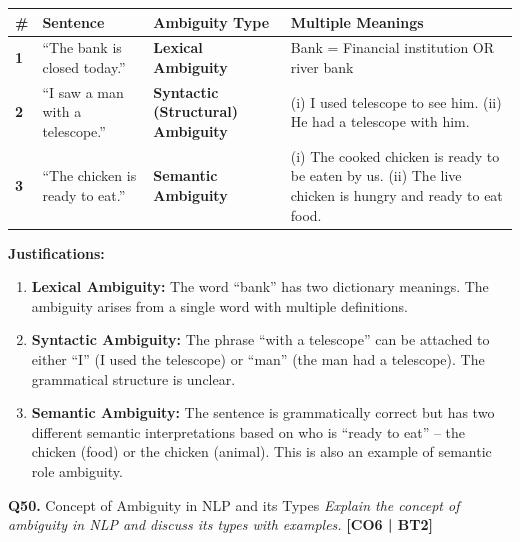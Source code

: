 \documentclass[12pt,a4paper]{article}
\newcommand{\Qno}[1]{\textbf{\color{darkred}Q#1.}}
\newcommand{\term}[1]{\textbf{\color{headingcolor}#1}}
\begin{document}
\begin{answerenv}

\begin{center}
\begin{tabular}{>{\bfseries}p{0.5cm} p{5cm} p{3.5cm} p{4cm}}
\toprule
\textbf{\#} & \textbf{Sentence} & \textbf{Ambiguity Type} & \textbf{Multiple Meanings} \\
\midrule
1 & ``The bank is closed today.'' & \textbf{Lexical Ambiguity} & Bank = Financial institution OR river bank \\[6pt]
2 & ``I saw a man with a telescope.'' & \textbf{Syntactic (Structural) Ambiguity} & (i) I used telescope to see him. (ii) He had a telescope with him. \\[6pt]
3 & ``The chicken is ready to eat.'' & \textbf{Semantic Ambiguity} & (i) The cooked chicken is ready to be eaten by us. (ii) The live chicken is hungry and ready to eat food. \\
\bottomrule
\end{tabular}
\end{center}

\textbf{\color{headingcolor}Justifications:}
\begin{enumerate}[leftmargin=1.8em, itemsep=4pt]
  \item \term{Lexical Ambiguity:} The word ``bank'' has two dictionary meanings. The ambiguity arises from a single word with multiple definitions.

  \item \term{Syntactic Ambiguity:} The phrase ``with a telescope'' can be attached to either ``I'' (I used the telescope) or ``man'' (the man had a telescope). The grammatical structure is unclear.

  \item \term{Semantic Ambiguity:} The sentence is grammatically correct but has two different semantic interpretations based on who is ``ready to eat'' -- the chicken (food) or the chicken (animal). This is also an example of semantic role ambiguity.
\end{enumerate}

\end{answerenv}

\vspace{8pt}

\begin{questionbox}{\Qno{50} Concept of Ambiguity in NLP and its Types}
\textit{Explain the concept of ambiguity in NLP and discuss its types with examples.} \hfill \textbf{[CO6 | BT2]}
\end{questionbox}
\end{document}
